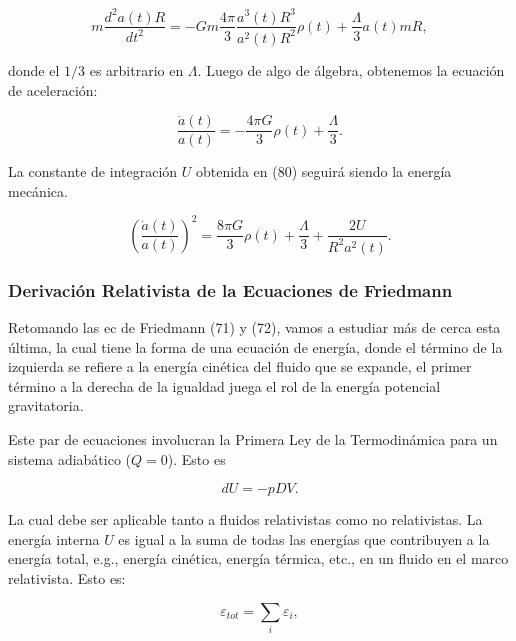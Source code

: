 \documentclass[11pt]{article}
\begin{document}
    \begin{equation}
        m \frac{d^2 a(t)R}{dt^2} = -Gm \frac{4\pi}{3}\frac{a^3(t)R^3}{a^2(t)R^2}\rho(t) + \frac{\Lambda}{3} a(t) mR,
    \end{equation}
    
    donde el $1/3$ es arbitrario en $\Lambda$. Luego de algo de álgebra, obtenemos la ecuación de aceleración: 
    
    \begin{equation}
        \boxed{\frac{\ddot{a}(t)}{a(t)} = - \frac{4\pi G}{3}  \rho(t) + \frac{\Lambda}{3}.} 
    \end{equation}
    
    La constante de integración $U$ obtenida en (80) seguirá siendo la energía mecánica. 
    
    \begin{equation}
        \boxed{\left(\frac{\dot{a}(t)}{a(t)} \right)^2 = \frac{8\pi G}{3} \rho(t) + \frac{\Lambda}{3} +  \frac{2U}{R^2 a^2(t)}.}
    \end{equation}
    
    \subsubsection{Derivación Relativista de la Ecuaciones de Friedmann}
    
    Retomando las ec de Friedmann (71) y (72), vamos a estudiar más de cerca esta última, la cual tiene la forma de una ecuación de energía, donde el término de la izquierda se refiere a la energía cinética del fluido que se expande, el primer término a la derecha de la igualdad juega el rol de la energía potencial gravitatoria.
    
    
    Este par de ecuaciones involucran la Primera Ley de la Termodinámica  para un sistema adiabático ($Q=0$). Esto es
    
    \begin{equation}
        dU = -p DV.
    \end{equation}
    
  La cual debe ser aplicable tanto a fluidos relativistas como no relativistas. La energía interna $U$ es igual a la suma de todas las energías que contribuyen a la energía total, e.g., energía cinética, energía térmica, etc., en un fluido en el marco relativista. Esto es:
  
  \begin{equation}
      \varepsilon_{tot} = \sum_i \varepsilon_i,
  \end{equation}
    
\end{document}
